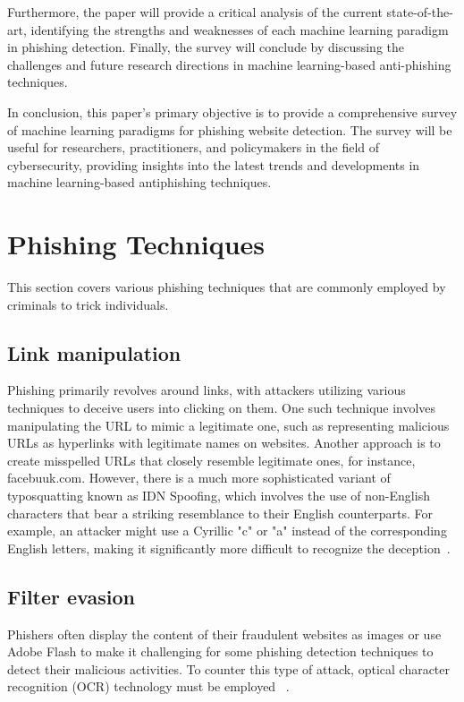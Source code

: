 \documentclass[final]{cvpr}
\begin{document}
Furthermore, the paper will provide a critical analysis of the current state-of-the-art, identifying the strengths and weaknesses of each machine learning paradigm in phishing detection. Finally, the survey will conclude by discussing the challenges and future research directions in machine learning-based anti-phishing techniques.

In conclusion, this paper's primary objective is to provide a comprehensive survey of machine learning paradigms for phishing website detection. The survey will be useful for researchers, practitioners, and policymakers in the field of cybersecurity, providing insights into the latest trends and developments in machine learning-based antiphishing techniques.

\section{Phishing Techniques}
\label{sec:Phishing Techniques}
This section covers various phishing techniques that are commonly employed by criminals to trick individuals.

\subsection{Link manipulation}

Phishing primarily revolves around links, with attackers utilizing various  techniques to deceive users into clicking on them. One such technique involves manipulating the URL to mimic a legitimate one, such as representing malicious URLs as hyperlinks with legitimate names on websites. Another approach is to create misspelled URLs that closely resemble legitimate ones, for instance, facebuuk.com. However, there is a much more sophisticated variant of typosquatting known as IDN Spoofing, which involves the use of non-English characters that bear a striking resemblance to their English counterparts. For example, an attacker might use a Cyrillic "c" or "a" instead of the corresponding English letters, making it significantly more difficult to recognize the deception~\cite{VB2018}.

\subsection{Filter evasion}

Phishers often display the content of their fraudulent websites as images or use Adobe Flash to make it challenging for some phishing detection techniques to detect their malicious activities. To counter this type of attack, optical character recognition (OCR) technology must be employed ~\cite{lam2009counteracting}.
\end{document}
